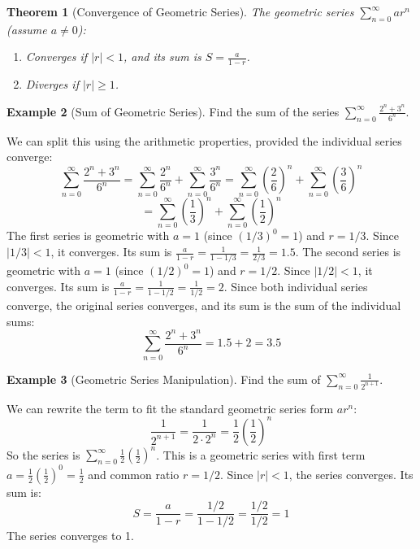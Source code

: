 \documentclass[11pt]{article}
\newtheorem{theorem}{Theorem}[section]
\theoremstyle{definition}
\newtheorem{example}[theorem]{Example}
\theoremstyle{remark}
\begin{document}
\begin{theorem}[Convergence of Geometric Series]
The geometric series $\sum_{n=0}^\infty ar^n$ (assume $a \neq 0$):
\begin{enumerate}
    \item Converges if $|r| < 1$, and its sum is $S = \frac{a}{1-r}$.
    \item Diverges if $|r| \ge 1$.
\end{enumerate}
\end{theorem}

\begin{example}[Sum of Geometric Series] \label{ex:geo_sum}
Find the sum of the series $\sum_{n=0}^\infty \frac{2^n + 3^n}{6^n}$.

We can split this using the arithmetic properties, provided the individual series converge:
\[ \sum_{n=0}^\infty \frac{2^n + 3^n}{6^n} = \sum_{n=0}^\infty \frac{2^n}{6^n} + \sum_{n=0}^\infty \frac{3^n}{6^n} = \sum_{n=0}^\infty \left(\frac{2}{6}\right)^n + \sum_{n=0}^\infty \left(\frac{3}{6}\right)^n \]
\[ = \sum_{n=0}^\infty \left(\frac{1}{3}\right)^n + \sum_{n=0}^\infty \left(\frac{1}{2}\right)^n \]
The first series is geometric with $a=1$ (since $(1/3)^0 = 1$) and $r=1/3$. Since $|1/3| < 1$, it converges. Its sum is $\frac{a}{1-r} = \frac{1}{1 - 1/3} = \frac{1}{2/3} = 1.5$.
The second series is geometric with $a=1$ (since $(1/2)^0 = 1$) and $r=1/2$. Since $|1/2| < 1$, it converges. Its sum is $\frac{a}{1-r} = \frac{1}{1 - 1/2} = \frac{1}{1/2} = 2$.
Since both individual series converge, the original series converges, and its sum is the sum of the individual sums:
\[ \sum_{n=0}^\infty \frac{2^n + 3^n}{6^n} = 1.5 + 2 = 3.5 \]
\end{example}

\begin{example}[Geometric Series Manipulation] \label{ex:geo_manip}
Find the sum of $\sum_{n=0}^\infty \frac{1}{2^{n+1}}$.

We can rewrite the term to fit the standard geometric series form $ar^n$:
\[ \frac{1}{2^{n+1}} = \frac{1}{2 \cdot 2^n} = \frac{1}{2} \left(\frac{1}{2}\right)^n \]
So the series is $\sum_{n=0}^\infty \frac{1}{2} \left(\frac{1}{2}\right)^n$.
This is a geometric series with first term $a = \frac{1}{2} (\frac{1}{2})^0 = \frac{1}{2}$ and common ratio $r = 1/2$.
Since $|r| < 1$, the series converges. Its sum is:
\[ S = \frac{a}{1-r} = \frac{1/2}{1 - 1/2} = \frac{1/2}{1/2} = 1 \]
The series converges to 1.
\end{example}
\end{document}
